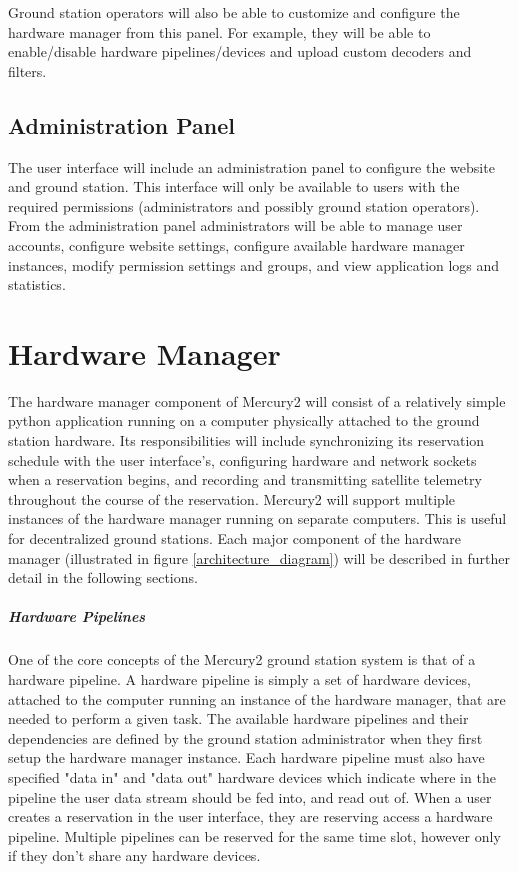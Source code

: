 \documentclass{mxl-design}
\begin{document}
Ground station operators will also be able to customize and configure the hardware manager from this panel. For example, they will be able to enable/disable hardware pipelines/devices and upload custom decoders and filters.

\subsection{Administration Panel}
\label{sec:admin_panel}
The user interface will include an administration panel to configure the website and ground station. This interface will only be available to users with the required permissions (administrators and possibly ground station operators). From the administration panel administrators will be able to manage user accounts, configure website settings, configure available hardware manager instances, modify permission settings and groups, and view application logs and statistics.

\section{Hardware Manager}
\label{sec:hardware_manager}
The hardware manager component of Mercury2 will consist of a relatively simple python application running on a computer physically attached to the ground station hardware. Its responsibilities will include synchronizing its reservation schedule with the user interface's, configuring hardware and network sockets when a reservation begins, and recording and transmitting satellite telemetry throughout the course of the reservation. Mercury2 will support multiple instances of the hardware manager running on separate computers. This is useful for decentralized ground stations. Each major component of the hardware manager (illustrated in figure \ref{architecture_diagram}) will be described in further detail in the following sections. 

\subparagraph{Hardware Pipelines}
One of the core concepts of the Mercury2 ground station system is that of a hardware pipeline. A hardware pipeline is simply a set of hardware devices, attached to the computer running an instance of the hardware manager, that are needed to perform a given task. The available hardware pipelines and their dependencies are defined by the ground station administrator when they first setup the hardware manager instance. Each hardware pipeline must also have specified "data in" and "data out" hardware devices which indicate where in the pipeline the user data stream should be fed into, and read out of. When a user creates a reservation in the user interface, they are reserving access a hardware pipeline. Multiple pipelines can be reserved for the same time slot, however only if they don't share any hardware devices.
\end{document}
